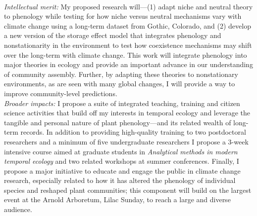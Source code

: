 \documentclass[12pt,a4paper,oneside]{article}
\begin{document}
\vspace{1.5ex}\\
\emph{Intellectual merit:} My proposed research will---(1) adapt niche and neutral theory to phenology while testing for how niche versus neutral mechanisms vary with climate change using a long-term dataset from Gothic, Colorado, and (2) develop a new version of the storage effect model that integrates phenology and nonstationarity in the environment to  test how coexistence mechanisms may shift over the long-term with climate change. This work will integrate phenology into major theories in ecology and provide an important advance in our understanding of community assembly. Further, by adapting these theories to nonstationary environments, as are seen with many global changes, I will provide a way to improve community-level predictions. 
\vspace{1.5ex}\\
\emph{Broader impacts:} I propose a suite of integrated teaching, training and citizen science activities that build off my interests in temporal ecology and leverage the tangible and personal nature of plant phenology---and its related wealth of long-term records. In addition to providing high-quality training to two postdoctoral researchers and a minimum of five undergraduate researchers I propose a 3-week intensive course aimed at graduate students in \emph{Analytical methods in modern temporal ecology} and two related workshops at summer conferences. Finally, I propose a major initiative to educate and engage the public in climate change research, especially related to how it has altered the phenology of individual species and reshaped plant communities; this component will build on the largest event at the Arnold Arboretum, Lilac Sunday, to reach a large and diverse audience.
\end{document}
